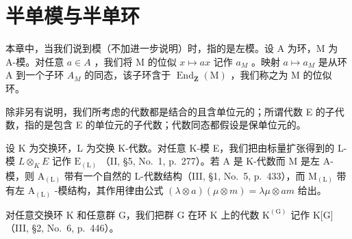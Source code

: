\chapter{半单模与半单环}

本章中，当我们说到模（不加进一步说明）时，指的是左模。设 A 为环，M 为 A-模。对任意 \(a \in A\) ，我们将 M 的位似 \(x \mapsto ax\) 记作 \(a_{M}\) 。映射 \(a \mapsto a_{M}\) 是从环 A 到一个子环 \(A_{M}\) 的同态，该子环含于 \(\operatorname{End}_{\mathbf{Z}}(\mathrm{M})\) ，我们称之为 M 的位似环。

除非另有说明，我们所考虑的代数都是结合的且含单位元的；所谓代数 E 的子代数，指的是包含 E 的单位元的子代数；代数同态都假设是保单位元的。

设 K 为交换环，L 为交换 K-代数。对任意 K-模 E，我们把由标量扩张得到的 L-模 \(L \otimes_{K} E\) 记作 \(\mathrm{E}_{(\mathrm{L})}\) （II, §5, No.~1, p.~277）。若 A 是 K-代数而 M 是左 A-模，则 \(\mathrm{A}_{(\mathrm{L})}\) 带有一个自然的 L-代数结构（III, §1, No.~5, p.~433），而 \(\mathrm{M}_{(\mathrm{L})}\) 带有左 \(\mathrm{A}_{(\mathrm{L})}\) -模结构，其作用律由公式 \((\lambda \otimes a)(\mu \otimes m) = \lambda \mu \otimes am\) 给出。

对任意交换环 K 和任意群 G，我们把群 G 在环 K 上的代数 \(\mathrm{K}^{(\mathrm{G})}\) 记作 K{[}G{]} （III, §2, No.~6, p.~446）。

